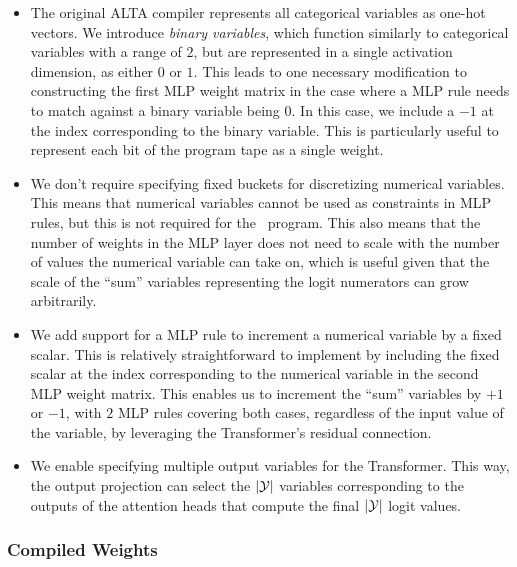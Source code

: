 \begin{itemize}
    \item The original ALTA compiler represents all categorical variables as one-hot vectors. We introduce \emph{binary variables}, which function similarly to categorical variables with a range of $2$, but are represented in a single activation dimension, as either $0$ or $1$. This leads to one necessary modification to constructing the first MLP weight matrix in the case where a MLP rule needs to match against a binary variable being $0$. In this case, we include a $-1$ at the index corresponding to the binary variable. This is particularly useful to represent each bit of the program tape as a single weight.
    \item We don't require specifying fixed buckets for discretizing numerical variables. This means that numerical variables cannot be used as constraints in MLP rules, but this is not required for the \zmap~program. This also means that the number of weights in the MLP layer does not need to scale with the number of values the numerical variable can take on, which is useful given that the scale of the ``sum'' variables representing the logit numerators can grow arbitrarily.
    \item We add support for a MLP rule to increment a numerical variable by a fixed scalar. This is relatively straightforward to implement by including the fixed scalar at the index corresponding to the numerical variable in the second MLP weight matrix. This enables us to increment the ``sum'' variables by $+1$ or $-1$, with $2$ MLP rules covering both cases, regardless of the input value of the variable, by leveraging the Transformer's residual connection.
    \item We enable specifying multiple output variables for the Transformer. This way, the output projection can select the $|{\mathcal{Y}}|$ variables corresponding to the outputs of the attention heads that compute the final $|{\mathcal{Y}}|$ logit values.
\end{itemize}

\subsubsection{Compiled Weights}

